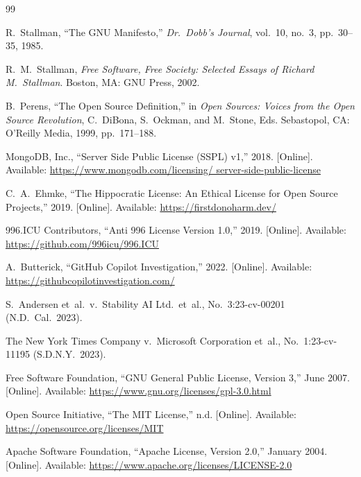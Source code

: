 \documentclass[11pt,twocolumn]{article}
\begin{document}
\begin{thebibliography}{99}

R.~Stallman, ``The GNU Manifesto,'' \emph{Dr.\ Dobb's Journal},
vol.~10, no.~3, pp.~30--35, 1985.

R.~M.~Stallman, \emph{Free Software, Free Society: Selected Essays of
Richard M.\ Stallman}. Boston, MA: GNU Press, 2002.

B.~Perens, ``The Open Source Definition,'' in \emph{Open Sources: Voices
from the Open Source Revolution}, C.~DiBona, S.~Ockman, and M.~Stone,
Eds. Sebastopol, CA: O'Reilly Media, 1999, pp.~171--188.

MongoDB, Inc., ``Server Side Public License (SSPL) v1,'' 2018.
[Online]. Available: \url{https://www.mongodb.com/licensing/
server-side-public-license}

C.~A.~Ehmke, ``The Hippocratic License: An Ethical License for Open
Source Projects,'' 2019.
[Online]. Available: \url{https://firstdonoharm.dev/}

996.ICU Contributors, ``Anti 996 License Version 1.0,'' 2019.
[Online]. Available: \url{https://github.com/996icu/996.ICU}

A.~Butterick, ``GitHub Copilot Investigation,'' 2022.
[Online]. Available: \url{https://githubcopilotinvestigation.com/}

S.~Andersen et~al.\ v.\ Stability AI Ltd.\ et~al., No.\ 3:23-cv-00201
(N.D.\ Cal.\ 2023).

The New York Times Company v.\ Microsoft Corporation et~al.,
No.\ 1:23-cv-11195 (S.D.N.Y.\ 2023).

Free Software Foundation, ``GNU General Public License, Version 3,''
June 2007.
[Online]. Available: \url{https://www.gnu.org/licenses/gpl-3.0.html}

Open Source Initiative, ``The MIT License,'' n.d.
[Online]. Available: \url{https://opensource.org/licenses/MIT}

Apache Software Foundation, ``Apache License, Version 2.0,'' January
2004.
[Online]. Available: \url{https://www.apache.org/licenses/LICENSE-2.0}


\end{thebibliography}
\end{document}
